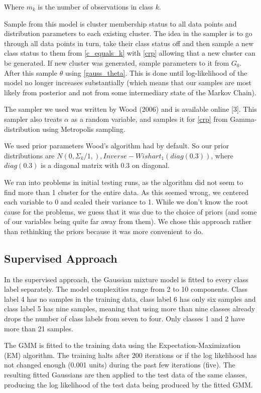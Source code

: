 \documentclass[a4paper]{article}
\begin{document}
  Where $m_k$ is the number of observations in class $k$.
  
  \par
  Sample from this model is cluster membership status to all data points and distribution parameters to each existing cluster. The idea in the sampler is to go through all data points in turn, take their class status off and then sample a new class status to them from \ref{c_equals_k} with \ref{crp} allowing that a new cluster can be generated. If new cluster was generated, sample parameters to it from $G_0$. After this sample $\theta$ using \ref{gauss_theta}. This is done until log-likelihood of the model no longer increases substantially (which means that our samples are most likely from posterior and not from some intermediary state of the Markov Chain).
  
  The sampler we used was written by Wood (2006) and is available online [3]. This sampler also treats $\alpha$ as a random variable, and samples it for \ref{crp} from Gamma-distribution using Metropolis sampling.
  
  We used prior parameters Wood's algorithm had by default. So our prior distributions are $N(0, \Sigma_k / 1,), Inverse-Wishart_{1}(diag(0.3))$, where $diag(0.3)$ is a diagonal matrix with $0.3$ on diagonal. 
  
  We ran into problems in initial testing runs, as the algorithm did not seem to find more than 1 cluster for the entire data. As this seemed wrong, we centered each variable to 0 and scaled their variance to 1. While we don't know the root cause for the problems, we guess that it was due to the choice of priors (and some of our variables being quite far away from them). We chose this approach rather than rethinking the priors because it was more convenient to do.
  
\subsection{Supervised Approach}

In the supervised approach, the Gaussian mixture model is fitted to every
class label separately. The model complexities range from 2 to 10 components.
Class label 4 has no samples in the training data, class label 6 has only six
samples and class label 5 has nine samples, meaning that using more than nine
classes already drops the number of class labels from seven to four. Only
classes 1 and 2 have more than 21 samples.

\par
The GMM is fitted to the training data using the Expectation-Maximization (EM)
algorithm. The training halts after 200 iterations or if the log likelihood
has not changed enough (0.001 units) during the past few iterations (five).
The resulting fitted Gaussians are then applied to the test data of the same
classes, producing the log likelihood of the test data being produced by the
fitted GMM.
\end{document}
